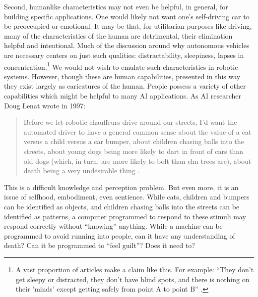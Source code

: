 Second, humanlike characteristics may not even be helpful, in general, for building
specific applications. One would likely not want one's self-driving car
to be preoccupied or emotional. It may be
that, for utilitarian 
purposes like driving, many of the characteristics of the human are
detrimental, their elimination helpful and intentional. Much of the
discussion around why autonomous vehicles are necessary centers on
just such qualities: distractability, sleepiness, lapses in
concentration.\footnote{A vast proportion of articles make a claim
  like this. For example: ``They don’t get sleepy or
  distracted, they don’t have blind spots, and there is nothing on
  their 'minds' except getting safely from point A to point B'' \cite{merrill}.} We
would not wish to emulate such 
characteristics in robotic systems. However, though these are human
capabilities, presented in this way they exist largely as caricatures
of the human. People possess a
variety of other capabilities which might be helpful to many AI
applications. As AI researcher Doug Lenat wrote in 1997:
\begin{quote}
Before we let robotic chauffeurs drive around our streets, I'd want the
  automated driver to have a general common sense about the value of a
cat versus a child versus a car bumper, about children chasing balls
into the streets, about young dogs being more likely to dart in front
of cars than old dogs (which, in turn, are more likely to bolt than
elm trees are), about death being a very undesirable thing \cite[p.
  122]{ekbia}.\end{quote} 

This is a difficult knowledge and perception problem. But even more,
it is an issue of selfhood, embodiment, even sentience. While cats,
children and bumpers can be identified as objects, and children
chasing balls into the streets can be identified as patterns, a
computer programmed to respond to these stimuli may respond correctly
without ``knowing'' anything. While a machine can be programmed to avoid
running into people, can it have any understanding of death? Can it be
programmed to ``feel guilt''? Does it need to?


